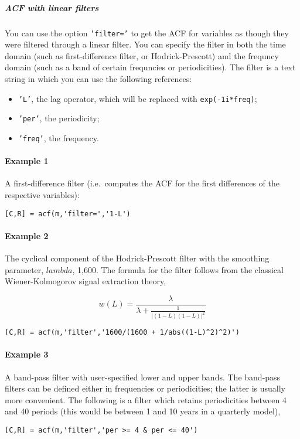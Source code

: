 \subparagraph{ACF with linear filters}\label{acf-with-linear-filters}

You can use the option \texttt{'filter='} to get the ACF for variables
as though they were filtered through a linear filter. You can specify
the filter in both the time domain (such as first-difference filter, or
Hodrick-Prescott) and the frequncy domain (such as a band of certain
frequncies or periodicities). The filter is a text string in which you
can use the following references:

\begin{itemize}
\itemsep1pt\parskip0pt
\item
  \texttt{'L'}, the lag operator, which will be replaced with
  \texttt{exp(-1i*freq)};
\item
  \texttt{'per'}, the periodicity;
\item
  \texttt{'freq'}, the frequency.
\end{itemize}

\paragraph{Example 1}\label{example-1}

A first-difference filter (i.e.~computes the ACF for the first
differences of the respective variables):

\begin{verbatim}
[C,R] = acf(m,'filter=','1-L')
\end{verbatim}

\paragraph{Example 2}\label{example-2}

The cyclical component of the Hodrick-Prescott filter with the smoothing
parameter, $lambda$, 1,600. The formula for the filter follows from the
classical Wiener-Kolmogorov signal extraction theory,

\[w(L) = \frac{\lambda}{\lambda + \frac{1}{ | (1-L)(1-L) | ^2}}\]

\begin{verbatim}
[C,R] = acf(m,'filter','1600/(1600 + 1/abs((1-L)^2)^2)')
\end{verbatim}

\paragraph{Example 3}\label{example-3}

A band-pass filter with user-specified lower and upper bands. The
band-pass filters can be defined either in frequencies or periodicities;
the latter is usually more convenient. The following is a filter which
retains periodicities between 4 and 40 periods (this would be between 1
and 10 years in a quarterly model),

\begin{verbatim}
[C,R] = acf(m,'filter','per >= 4 & per <= 40')
\end{verbatim}


